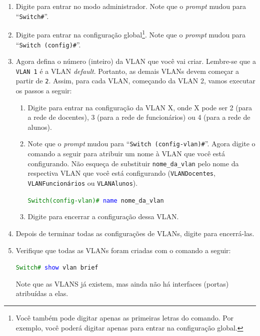 \begin{enumerate}[label*=\arabic*.]
    \item Digite  para entrar no modo administrador. Note que o \textit{prompt} mudou para \enquote{\texttt{Switch\#}}.
    \item Digite  para entrar na configuração global\footnote{Você também pode digitar apenas as primeiras letras do comando. Por exemplo, você poderá digitar apenas  para entrar na configuração global.}. Note que o \textit{prompt} mudou para \enquote{\texttt{Switch (config)\#}}.
    \item Agora defina o número (inteiro) da VLAN que você vai criar. Lembre-se que a \texttt{VLAN 1} é a VLAN \textit{default}. Portanto, as demais VLANs devem começar a partir de \texttt{2}. Assim, para cada VLAN, começando da VLAN 2, vamos executar os passos a seguir:
    
    \begin{enumerate}[label*=\arabic*.]
        \item Digite  para entrar na configuração da VLAN X, onde X pode ser 2 (para a rede de docentes), 3 (para a rede de funcionários) ou 4 (para a rede de alunos).
        \item Note que o \textit{prompt} mudou para  \enquote{\texttt{Switch (config-vlan)\#}}. Agora digite o comando a seguir  para atribuir um nome à VLAN que você está configurando. Não esqueça de substituir \texttt{nome\_da\_vlan} pelo nome da respectiva VLAN que você está configurando (\texttt{VLANDocentes}, \texttt{VLANFuncionários} ou \texttt{VLANAlunos}).

        \texttt{\textcolor{green}{Switch(config-vlan)\#} \textcolor{blue}{name} nome\_da\_vlan}

        \item Digite  para encerrar a configuração dessa VLAN.
    \end{enumerate}

    \item Depois de terminar todas as configurações de VLANs, digite  para encerrá-las.
    
    \item Verifique que todas as VLANs foram criadas com o comando a seguir:  

       \texttt{\textcolor{green}{Switch\#} \textcolor{blue}{show} vlan brief}

    Note que as VLANS já existem, mas ainda não há  interfaces (portas) atribuídas a elas.
       

\end{enumerate}
